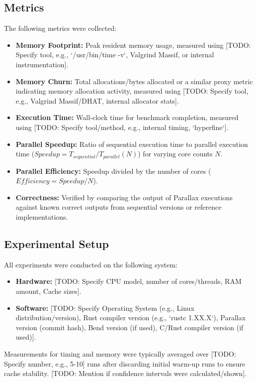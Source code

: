 \subsection{Metrics} %
The following metrics were collected:
\begin{itemize}
    \item \textbf{Memory Footprint:} Peak resident memory usage, measured using [TODO: Specify tool, e.g., `/usr/bin/time -v`, Valgrind Massif, or internal instrumentation].
    \item \textbf{Memory Churn:} Total allocations/bytes allocated or a similar proxy metric indicating memory allocation activity, measured using [TODO: Specify tool, e.g., Valgrind Massif/DHAT, internal allocator stats].
    \item \textbf{Execution Time:} Wall-clock time for benchmark completion, measured using [TODO: Specify tool/method, e.g., internal timing, `hyperfine`].
    \item \textbf{Parallel Speedup:} Ratio of sequential execution time to parallel execution time ($Speedup = T_{sequential} / T_{parallel}(N)$) for varying core counts $N$.
    \item \textbf{Parallel Efficiency:} Speedup divided by the number of cores ($Efficiency = Speedup / N$).
    \item \textbf{Correctness:} Verified by comparing the output of Parallax executions against known correct outputs from sequential versions or reference implementations.
\end{itemize}

\subsection{Experimental Setup} %
All experiments were conducted on the following system:
\begin{itemize}
    \item \textbf{Hardware:} [TODO: Specify CPU model, number of cores/threads, RAM amount, Cache sizes].
    \item \textbf{Software:} [TODO: Specify Operating System (e.g., Linux distribution/version), Rust compiler version (e.g., `rustc 1.XX.X`), Parallax version (commit hash), Bend version (if used), C/Rust compiler version (if used)].
\end{itemize}
Measurements for timing and memory were typically averaged over [TODO: Specify number, e.g., 5-10] runs after discarding initial warm-up runs to ensure cache stability. [TODO: Mention if confidence intervals were calculated/shown].

